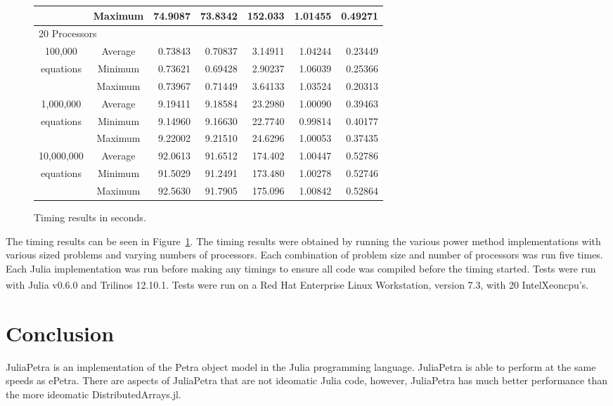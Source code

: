 \documentclass[acmsmall]{acmart}
\let\oldtextregister\textregistered
\renewcommand{\textregistered}{\textsuperscript{\tiny\oldtextregister}}
\begin{document}
\begin{figure}[h]
\begin{tabular}{|c c|r|r|r||r|r|}
						&Maximum & 74.9087 & 73.8342 & 152.033 & 1.01455 & 0.49271 \\
	\hline
			\multicolumn{7}{|l|}{20 Processors}\\
	\hline
		100,000			&Average & 0.73843 & 0.70837 & 3.14911 & 1.04244 & 0.23449 \\
		equations		&Minimum & 0.73621 & 0.69428 & 2.90237 & 1.06039 & 0.25366 \\
						&Maximum & 0.73967 & 0.71449 & 3.64133 & 1.03524 & 0.20313 \\
	\hline
		1,000,000		&Average & 9.19411 & 9.18584 & 23.2980 & 1.00090 & 0.39463 \\
		equations		&Minimum & 9.14960 & 9.16630 & 22.7740 & 0.99814 & 0.40177 \\
						&Maximum & 9.22002 & 9.21510 & 24.6296 & 1.00053 & 0.37435 \\
	\hline
		10,000,000		&Average & 92.0613 & 91.6512 & 174.402 & 1.00447 & 0.52786 \\
		equations		&Minimum & 91.5029 & 91.2491 & 173.480 & 1.00278 & 0.52746 \\
						&Maximum & 92.5630 & 91.7905 & 175.096 & 1.00842 & 0.52864 \\
	\hline
\end{tabular}

\caption{Timing results in seconds.}
\label{fig:timing-results}
\end{figure}

The timing results can be seen in Figure~\ref{fig:timing-results}.
The timing results were obtained by running the various power method implementations
with various sized problems and varying numbers of processors.
Each combination of problem size and number of processors was run five times.
Each Julia implementation was run before making any timings to ensure all code was
compiled before the timing started.
Tests were run with Julia v0.6.0 and Trilinos 12.10.1.
Tests were run on a Red Hat Enterprise Linux Workstation, version 7.3,
with 20 Intel\textregistered Xeon\textregistered cpu's.


\section{Conclusion}

JuliaPetra is an implementation of the Petra object model in the Julia programming language.
JuliaPetra is able to perform at the same speeds as ePetra.
There are aspects of JuliaPetra that are not ideomatic Julia code, however, JuliaPetra has much
better performance than the more ideomatic DistributedArrays.jl.



\end{document}
